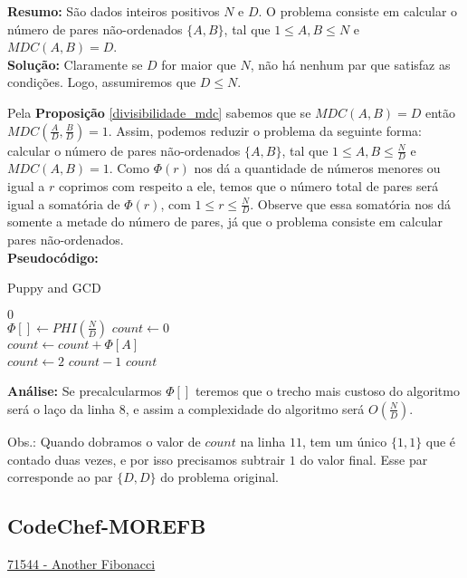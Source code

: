 \textbf{Resumo:}
São dados inteiros positivos $N$ e $D$. O problema consiste em calcular o número de pares não-ordenados $\{A,B\}$, tal que $1\leq A,B \leq N$ e $MDC(A,B)=D$.
\\

\textbf{Solução:}
Claramente se $D$ for maior que $N$, não há nenhum par que satisfaz as condições. Logo, assumiremos que $D \leq N$.

Pela \textbf{Proposição} \autoref{divisibilidade_mdc} sabemos que se $MDC(A,B)=D$ então $MDC(\frac{A}{D}, \frac{B}{D})=1$. Assim, podemos reduzir o problema da seguinte forma:
calcular o número de pares não-ordenados $\{A,B\}$, tal que $1\leq A,B \leq \frac{N}{D}$ e $MDC(A,B)=1$.
Como $\Phi(r)$ nos dá a quantidade de números menores ou igual a $r$ coprimos com respeito a ele, temos que 
o número total de pares será igual a somatória de $\Phi(r)$, com $1 \leq r \leq \frac{N}{D}$.
Observe que essa somatória nos dá somente a metade do número de pares, já que o problema consiste em calcular pares não-ordenados.
\\

\textbf{Pseudocódigo:}
\begin{algorithm}
\caption{Puppy and GCD}
\begin{algorithmic}[1]
\State \Return $0$
\EndIf
\\
\State $\Phi[] \gets PHI(\frac{N}{D})$
\State $count \gets 0$
\\
\State $count \gets count + \Phi[A]$
\EndFor
\\
\State $count \gets 2$ $count - 1$
\State \Return $count$
\EndProcedure
\end{algorithmic}
\end{algorithm}

\textbf{Análise:}
Se precalcularmos $\Phi[]$ teremos que o trecho mais custoso do algoritmo será o laço da linha $8$, e assim a complexidade do algoritmo será $O(\frac{N}{D})$.

Obs.: Quando dobramos o valor de $count$ na linha $11$, tem um único $\{1,1\}$ que é contado duas vezes, e por isso precisamos subtrair $1$ do valor final. 
Esse par corresponde ao par $\{D,D\}$ do problema original.




\subsection{CodeChef-MOREFB}
\href{https://www.codechef.com/problems/MOREFB}{71544 - Another Fibonacci}\\

